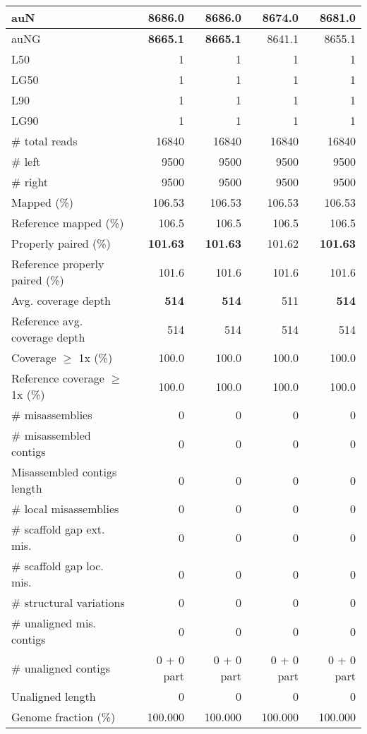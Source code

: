 \documentclass[12pt,a4paper]{article}
\begin{document}
\begin{table}[ht]
\begin{center}
\begin{tabular}{|l*{4}{|r}|}
auN & {\bf 8686.0} & {\bf 8686.0} & 8674.0 & 8681.0 \\ \hline
auNG & {\bf 8665.1} & {\bf 8665.1} & 8641.1 & 8655.1 \\ \hline
L50 & 1 & 1 & 1 & 1 \\ \hline
LG50 & 1 & 1 & 1 & 1 \\ \hline
L90 & 1 & 1 & 1 & 1 \\ \hline
LG90 & 1 & 1 & 1 & 1 \\ \hline
\# total reads & 16840 & 16840 & 16840 & 16840 \\ \hline
\# left & 9500 & 9500 & 9500 & 9500 \\ \hline
\# right & 9500 & 9500 & 9500 & 9500 \\ \hline
Mapped (\%) & 106.53 & 106.53 & 106.53 & 106.53 \\ \hline
Reference mapped (\%) & 106.5 & 106.5 & 106.5 & 106.5 \\ \hline
Properly paired (\%) & {\bf 101.63} & {\bf 101.63} & 101.62 & {\bf 101.63} \\ \hline
Reference properly paired (\%) & 101.6 & 101.6 & 101.6 & 101.6 \\ \hline
Avg. coverage depth & {\bf 514} & {\bf 514} & 511 & {\bf 514} \\ \hline
Reference avg. coverage depth & 514 & 514 & 514 & 514 \\ \hline
Coverage $\geq$ 1x (\%) & 100.0 & 100.0 & 100.0 & 100.0 \\ \hline
Reference coverage $\geq$ 1x (\%) & 100.0 & 100.0 & 100.0 & 100.0 \\ \hline
\# misassemblies & 0 & 0 & 0 & 0 \\ \hline
\# misassembled contigs & 0 & 0 & 0 & 0 \\ \hline
Misassembled contigs length & 0 & 0 & 0 & 0 \\ \hline
\# local misassemblies & 0 & 0 & 0 & 0 \\ \hline
\# scaffold gap ext. mis. & 0 & 0 & 0 & 0 \\ \hline
\# scaffold gap loc. mis. & 0 & 0 & 0 & 0 \\ \hline
\# structural variations & 0 & 0 & 0 & 0 \\ \hline
\# unaligned mis. contigs & 0 & 0 & 0 & 0 \\ \hline
\# unaligned contigs & 0 + 0 part & 0 + 0 part & 0 + 0 part & 0 + 0 part \\ \hline
Unaligned length & 0 & 0 & 0 & 0 \\ \hline
Genome fraction (\%) & 100.000 & 100.000 & 100.000 & 100.000 \\ \hline

\end{tabular}
\end{center}
\end{table}
\end{document}
